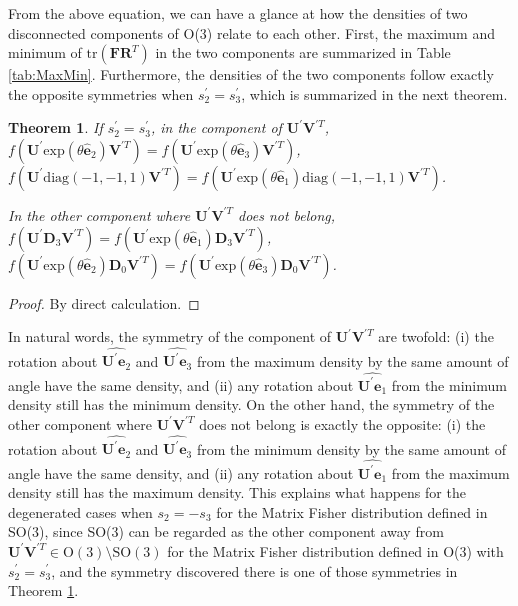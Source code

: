 \documentclass[12pt]{article}
\newtheorem{theorem}{Theorem}
\begin{document}
From the above equation, we can have a glance at how the densities of two disconnected components of O(3) relate to each other.
First, the maximum and minimum of $\mathrm{tr}(\mathbf{F}\mathbf{R}^T)$ in the two components are summarized in Table \ref{tab:MaxMin}.
Furthermore, the densities of the two components follow exactly the opposite symmetries when $s^\prime_2=s^\prime_3$, which is summarized in the next theorem.

\begin{theorem} \label{thm:Symmetry}
	If $s^\prime_2=s^\prime_3$, in the component of $\mathbf{U}^\prime\mathbf{V}^{\prime T}$, $f(\mathbf{U}^\prime\mathrm{exp}(\theta\hat{\bm{e}}_2)\mathbf{V}^{\prime T}) = f(\mathbf{U}^\prime\mathrm{exp}(\theta\hat{\bm{e}}_3)\mathbf{V}^{\prime T})$, $f(\mathbf{U}^\prime\mathrm{diag}(-1,-1,1)\mathbf{V}^{\prime T}) = f(\mathbf{U}^\prime\mathrm{exp}(\theta\hat{\bm{e}}_1)\mathrm{diag}(-1,-1,1)\mathbf{V}^{\prime T})$.
	
	In the other component where $\mathbf{U}^\prime\mathbf{V}^{\prime T}$ does not belong, $f(\mathbf{U}^\prime\mathbf{D}_3\mathbf{V}^{\prime T})=f(\mathbf{U}^\prime\mathrm{exp}(\theta\hat{\bm{e}}_1)\mathbf{D}_3\mathbf{V}^{\prime T})$, $f(\mathbf{U}^\prime\mathrm{exp}(\theta\hat{\bm{e}}_2)\mathbf{D}_0\mathbf{V}^{\prime T})=f(\mathbf{U}^\prime\mathrm{exp}(\theta\hat{\bm{e}}_3)\mathbf{D}_0\mathbf{V}^{\prime T})$.
\end{theorem}
\begin{proof}
	By direct calculation.
\end{proof}
In natural words, the symmetry of the component of $\mathbf{U}^\prime\mathbf{V}^{\prime T}$ are twofold: (i) the rotation about $\widehat{\mathbf{U}^\prime\bm{e}_2}$ and $\widehat{\mathbf{U}^\prime\bm{e}_3}$ from the maximum density by the same amount of angle have the same density, and (ii) any rotation about $\widehat{\mathbf{U}^\prime\bm{e}_1}$ from the minimum density still has the minimum density.
On the other hand, the symmetry of the other component where $\mathbf{U}^\prime\mathbf{V}^{\prime T}$ does not belong is exactly the opposite: (i) the rotation about $\widehat{\mathbf{U}^\prime\bm{e}_2}$ and $\widehat{\mathbf{U}^\prime\bm{e}_3}$ from the minimum density by the same amount of angle have the same density, and (ii) any rotation about $\widehat{\mathbf{U}^\prime\bm{e}_1}$ from the maximum density still has the maximum density.
This explains what happens for the degenerated cases when $s_2=-s_3$ for the Matrix Fisher distribution defined in SO(3), since SO(3) can be regarded as the other component away from $\mathbf{U}^\prime\mathbf{V}^{\prime T}\in\mathrm{O}(3)\setminus\mathrm{SO}(3)$ for the Matrix Fisher distribution defined in O(3) with $s^\prime_2=s^\prime_3$, and the symmetry discovered there is one of those symmetries in Theorem \ref{thm:Symmetry}.
\end{document}
